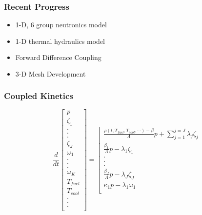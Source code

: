 

\begin{frame}[fragile]
  \frametitle{Recent Progress}
  \begin{itemize}
    \item 1-D, 6 group neutronics model
    \item 1-D thermal hydraulics model
    \item Forward Difference Coupling 
    \item 3-D Mesh Development
  \end{itemize}
\end{frame}

\begin{frame}[fragile]
  \frametitle{Coupled Kinetics}
  \footnotesize{
\begin{equation} 
  \frac{d}{dt}\left[
    \begin{array}{c}
      p\\
      \zeta_1\\
      .\\
      .\\
      .\\
      \zeta_J\\
      \omega_1\\
      .\\
      .\\
      .\\
      \omega_K\\
      T_{fuel}\\
      T_{cool}\\
      .\\
      .\\
      .\\
    \end{array}
    \right]
    =
    \left[
      \begin{array}{ c }
        \frac{\rho(t,T_{fuel},T_{cool},\cdots)-\beta}{\Lambda}p + 
        \displaystyle\sum^{j=J}_{j=1}\lambda_j\zeta_j\\
        \frac{\beta_1}{\Lambda} p - \lambda_1\zeta_1\\
        .\\
        .\\
        .\\
        \frac{\beta_J}{\Lambda}p-\lambda_J\zeta_J\\
        \kappa_1p - \lambda_1\omega_1\\

\end{array}
\end{equation}}
\end{frame}
